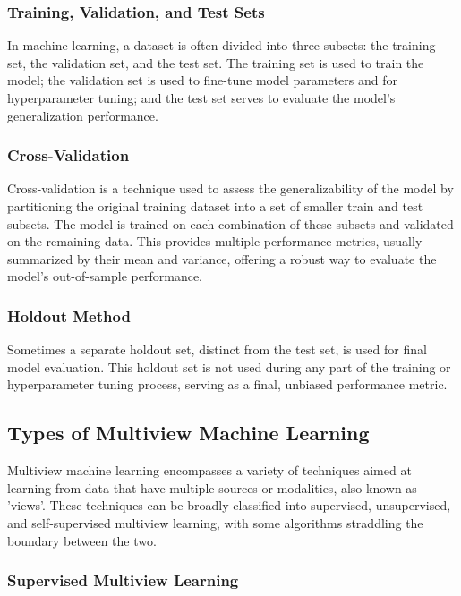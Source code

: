 \subsubsection{Training, Validation, and Test Sets}

In machine learning, a dataset is often divided into three subsets: the training set, the validation set, and the test set. The training set is used to train the model; the validation set is used to fine-tune model parameters and for hyperparameter tuning; and the test set serves to evaluate the model's generalization performance. 

\subsubsection{Cross-Validation}

Cross-validation is a technique used to assess the generalizability of the model by partitioning the original training dataset into a set of smaller train and test subsets. The model is trained on each combination of these subsets and validated on the remaining data. This provides multiple performance metrics, usually summarized by their mean and variance, offering a robust way to evaluate the model's out-of-sample performance.

\subsubsection{Holdout Method}

Sometimes a separate holdout set, distinct from the test set, is used for final model evaluation. This holdout set is not used during any part of the training or hyperparameter tuning process, serving as a final, unbiased performance metric.

\subsection{Types of Multiview Machine Learning}

Multiview machine learning encompasses a variety of techniques aimed at learning from data that have multiple sources or modalities, also known as 'views'. These techniques can be broadly classified into supervised, unsupervised, and self-supervised multiview learning, with some algorithms straddling the boundary between the two. 

\subsubsection{Supervised Multiview Learning}

